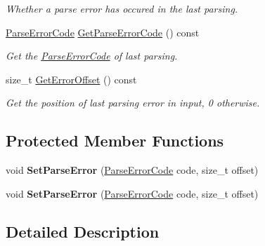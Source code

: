 \begin{DoxyCompactItemize}
\begin{DoxyCompactList}\small\item\em Whether a parse error has occured in the last parsing. \end{DoxyCompactList}\item 
\mbox{\label{classGenericReader_a937bf90919f50e1c370b312cee5833e8}} 
\hyperlink{group__RAPIDJSON__ERRORS_ga8d4b32dfc45840bca189ade2bbcb6ba7}{Parse\+Error\+Code} \hyperlink{classGenericReader_a937bf90919f50e1c370b312cee5833e8}{Get\+Parse\+Error\+Code} () const
\begin{DoxyCompactList}\small\item\em Get the \hyperlink{group__RAPIDJSON__ERRORS_ga8d4b32dfc45840bca189ade2bbcb6ba7}{Parse\+Error\+Code} of last parsing. \end{DoxyCompactList}\item 
\mbox{\label{classGenericReader_ae9008523ccd06d839a57335835cb4091}} 
size\+\_\+t \hyperlink{classGenericReader_ae9008523ccd06d839a57335835cb4091}{Get\+Error\+Offset} () const
\begin{DoxyCompactList}\small\item\em Get the position of last parsing error in input, 0 otherwise. \end{DoxyCompactList}\end{DoxyCompactItemize}
\subsection*{Protected Member Functions}
\begin{DoxyCompactItemize}
\item 
\mbox{\label{classGenericReader_ae50079444295bf109730c3b708a818a6}} 
void {\bfseries Set\+Parse\+Error} (\hyperlink{group__RAPIDJSON__ERRORS_ga8d4b32dfc45840bca189ade2bbcb6ba7}{Parse\+Error\+Code} code, size\+\_\+t offset)
\item 
\mbox{\label{classGenericReader_ae50079444295bf109730c3b708a818a6}} 
void {\bfseries Set\+Parse\+Error} (\hyperlink{group__RAPIDJSON__ERRORS_ga8d4b32dfc45840bca189ade2bbcb6ba7}{Parse\+Error\+Code} code, size\+\_\+t offset)
\end{DoxyCompactItemize}


\subsection{Detailed Description}
